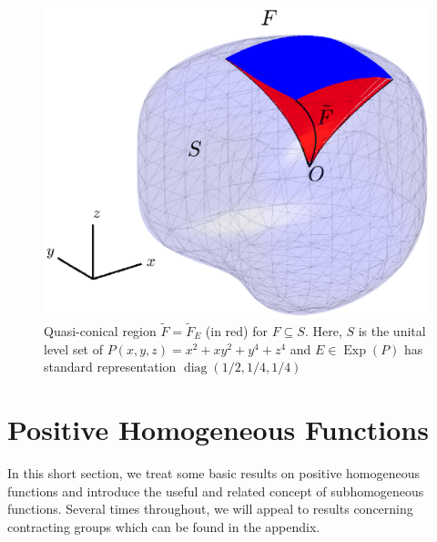 \documentclass[smallextended]{svjour3}
\theoremstyle{remark}
\newcommand\Exp{\operatorname{Exp}}
\newcommand\diag{\operatorname{diag}}
\begin{document}
\begin{figure}[!htb]
    \centering
    \includegraphics[scale=0.5, trim={1cm 3cm 1cm 2cm},clip]{Fig4.eps}
    \caption{Quasi-conical region $\widetilde{F}=\widetilde{F}_E$ (in red) for $F\subseteq S$. Here, $S$ is the unital level set of $P(x,y,z) = x^2 + xy^2 + y^4 + z^4$ and $E\in\Exp(P)$ has standard representation $\diag(1/2,1/4,1/4)$}
    \label{fig:level_set_F_3D}
\end{figure}

















\section{Positive Homogeneous Functions}\label{sec:Homogeneous}

In this short section, we treat some basic results on positive homogeneous functions and introduce the useful and related concept of subhomogeneous functions. Several times throughout, we will appeal to results concerning contracting groups which can be found in the appendix.
\end{document}

